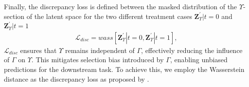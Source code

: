 \documentclass[doubleblind]{ecai}
\begin{document}
	
	
	
	

	
	
	Finally, the discrepancy loss is defined between the masked distribution of the $\Upsilon$-section of the latent space for the two different treatment cases $\mathbf{Z}_{\Upsilon}^\prime | t=0$ and $\mathbf{Z}_{\Upsilon}^\prime | t=1$
	\begin{eqnarray}
		\mathcal{L}_{disc}
		=
		wass
		[\mathbf{Z}_{\Upsilon}^\prime | t=0,
		\mathbf{Z}_{\Upsilon}^\prime | t=1],
	\end{eqnarray}
	\textbf{{$\mathcal{L}_{disc}$}} ensures that $\Upsilon$ remains independent of $\Gamma$, effectively reducing the influence of 
	$\Gamma$ on $\Upsilon$. This mitigates selection bias introduced by $\Gamma$, enabling unbiased predictions for the downstream task. To achieve this, we employ the Wasserstein distance as the discrepancy loss as proposed by \citep{Khan2024OnTE}.
	
\end{document}

